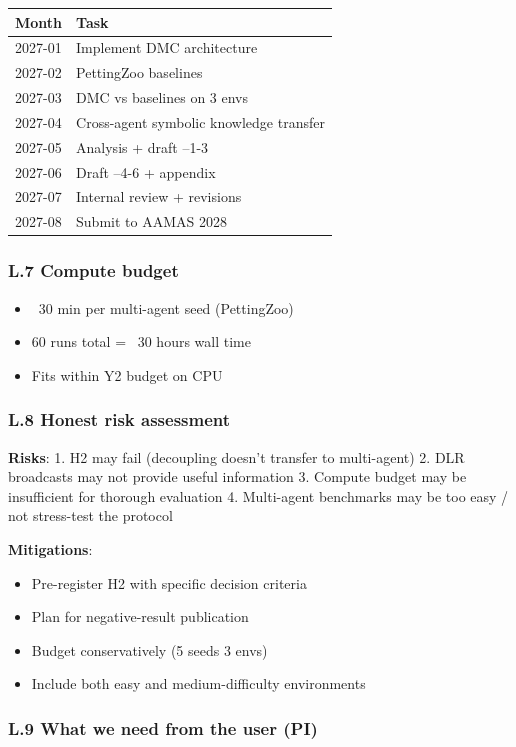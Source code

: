 \documentclass[11pt]{article}
\begin{document}
\begin{tabular}{ll}
Month & Task \\
\hline
2027-01 & Implement DMC architecture \\
2027-02 & PettingZoo baselines \\
2027-03 & DMC vs baselines on 3 envs \\
2027-04 & Cross-agent symbolic knowledge transfer \\
2027-05 & Analysis + draft --1-3 \\
2027-06 & Draft --4-6 + appendix \\
2027-07 & Internal review + revisions \\
2027-08 & Submit to AAMAS 2028 \\
\end{tabular}


\subsubsection{L.7 Compute budget}

\begin{itemize}
  \item ~30 min per multi-agent seed (PettingZoo)
  \item 60 runs total = ~30 hours wall time
  \item Fits within Y2 budget on CPU
\end{itemize}


\subsubsection{L.8 Honest risk assessment}

\textbf{Risks}:
1. H2 may fail (decoupling doesn't transfer to multi-agent)
2. DLR broadcasts may not provide useful information
3. Compute budget may be insufficient for thorough evaluation
4. Multi-agent benchmarks may be too easy / not stress-test the protocol

\textbf{Mitigations}:
\begin{itemize}
  \item Pre-register H2 with specific decision criteria
  \item Plan for negative-result publication
  \item Budget conservatively (5 seeds  3 envs)
  \item Include both easy and medium-difficulty environments
\end{itemize}


\subsubsection{L.9 What we need from the user (PI)}
\end{document}
